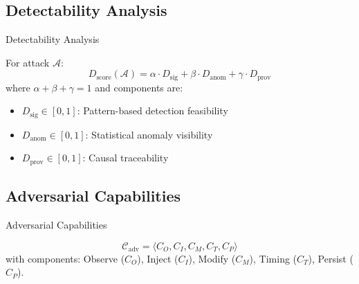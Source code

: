 \documentclass[
  ignorenonframetext,
]{beamer}
\begin{document}
\subsection{Detectability Analysis}\label{sec:detectability}

\begin{frame}[allowframebreaks]{Detectability Analysis}
\begin{definition}
\label{def:detectability}
For attack $\mathcal{A}$:
\begin{equation}
\label{eq:detectability}
D_{\text{score}}(\mathcal{A}) = \alpha \cdot D_{\text{sig}} + \beta \cdot D_{\text{anom}} + \gamma \cdot D_{\text{prov}}
\end{equation}
where $\alpha + \beta + \gamma = 1$ and components are:
\begin{itemize}
\item $D_{\text{sig}} \in [0,1]$: Pattern-based detection feasibility
\item $D_{\text{anom}} \in [0,1]$: Statistical anomaly visibility
\item $D_{\text{prov}} \in [0,1]$: Causal traceability
\end{itemize}
\end{definition}
\end{frame}

\subsection{Adversarial Capabilities}\label{sec:capabilities}

\begin{frame}[allowframebreaks]{Adversarial Capabilities}
\begin{definition}
\label{def:capability-set}
\begin{equation}
\label{eq:capability-set}
\mathcal{C}_{\text{adv}} = \langle C_O, C_I, C_M, C_T, C_P \rangle
\end{equation}
with components: Observe ($C_O$), Inject ($C_I$), Modify ($C_M$), Timing ($C_T$), Persist ($C_P$).
\end{definition}

\end{frame}
\end{document}
